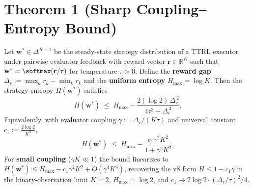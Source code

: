 %
%
%

\section*{Theorem 1 (Sharp Coupling--Entropy Bound)}

\begin{theorem}
\label{thm:T1}
Let $\mathbf{w}^* \in \Delta^{K-1}$ be the steady-state strategy distribution of a
TTRL executor under pairwise evaluator feedback with reward vector
$\mathbf{r} \in \mathbb{R}^K$ such that
$\mathbf{w}^* = \softmax(\mathbf{r}/\tau)$ for temperature $\tau > 0$.
Define the \textbf{reward gap}
$\Delta_r := \max_k r_k - \min_k r_k$ and the \textbf{uniform entropy}
$H_{\max} = \log K$. Then the strategy entropy $H(\mathbf{w}^*)$ satisfies
\[
  H(\mathbf{w}^*) \;\le\; H_{\max} - \frac{2(\log 2) \, \Delta_r^{\,2}}{4\tau^2 + \Delta_r^{\,2}}.
\]
Equivalently, with evaluator coupling $\gamma := \Delta_r / (K\tau)$ and
universal constant $c_1 := \frac{2\log 2}{K^2}$,
\[
  H(\mathbf{w}^*) \;\le\; H_{\max} - \frac{c_1 \gamma^2 K^2}{1 + \gamma^2 K^2}.
\]
For \textbf{small coupling} ($\gamma K \ll 1$) the bound linearizes to
$H(\mathbf{w}^*) \le H_{\max} - c_1 \gamma^2 K^2 + O(\gamma^4 K^4)$, recovering
the v8 form $H \le 1 - c_1 \gamma$ in the binary-observation limit $K=2$,
$H_{\max} = \log 2$, and $c_1 \mapsto 2\log 2 \cdot (\Delta_r/\tau)^2/4$.
\end{theorem}

